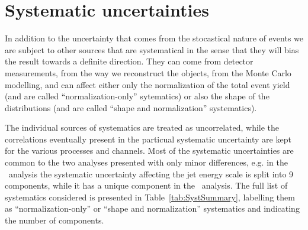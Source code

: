 


\section{Systematic uncertainties}\label{sec:systematics}

In addition to the uncertainty that comes from the stocastical nature
of events we are subject to other sources that are systematical in the sense
that they will bias the result towards a definite direction. They can come from
detector measurements, from the way we reconstruct the objects, from the Monte
Carlo modelling, and can affect either only the normalization of the total event
yield (and are called ``normalization-only'' sytematics) or also the shape 
of the distributions (and are called ``shape and normalization'' systematics).

The individual sources of systematics are treated as uncorrelated, while
the correlations eventually present in the particual systematic uncertainty are 
kept for the various processes and channels. Most of the systematic uncertainties
are common to the two analyses presented with only minor differences, e.g. in the
\htx\  analysis the systematic uncertainty affecting the jet energy scale is
split into 9 components, while it has a unique component in the \wbx\  analysis. 
The full list of systematics considered is presented in 
Table~\ref{tab:SystSummary}, labelling them as  ``normalization-only'' 
or ``shape and normalization'' systematics and indicating the number of components.

